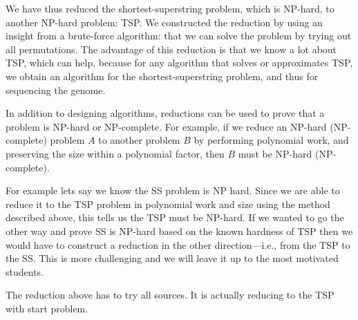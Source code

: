 \begin{gram}[Summary]
We have thus reduced the shortest-superstring problem, which is
NP-hard, to another NP-hard problem: TSP.
%
We constructed the reduction by using an insight from a brute-force
algorithm: that we can solve the problem by trying out all
permutations. 
%
The advantage of this reduction is that we know a lot about TSP, which
can help, because for any algorithm that solves or approximates TSP,
we obtain an algorithm for the shortest-superstring problem, and thus
for sequencing the genome.

\end{gram}

\begin{remark}
In addition to designing algorithms, reductions can be used to prove
that a problem is NP-hard or NP-complete.  For example, if we reduce
an NP-hard (NP-complete) problem $A$ to another problem $B$ by
performing polynomial work, and preserving the size within a
polynomial factor, then $B$ must be NP-hard (NP-complete).

For example lets say we know the SS problem is NP hard.   Since we are
able to reduce it to the TSP problem in polynomial work and size using the
method described above, this tells us the TSP must be NP-hard.     If
we wanted to go the other way and prove SS is NP-hard based on the
known hardness of TSP then we would have to construct a reduction in the
other direction---i.e., from the TSP to the SS.      This is more
challenging and we will leave it up to the most motivated students.
\end{remark}

\begin{teachnote}
The reduction above has to try all sources.  It is actually reducing
to the TSP with start problem.
\end{teachnote}





